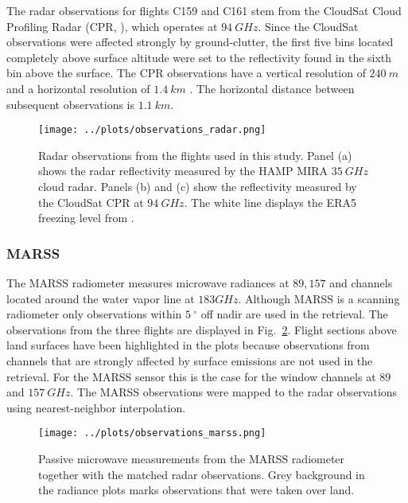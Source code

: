 \documentclass[journal abbreviation, manuscript]{copernicus}
\begin{document}
The radar observations for flights C159 and C161 stem from the CloudSat Cloud
Profiling Radar (CPR, \citet{tanelli08}), which operates at $94\ \unit{GHz}$.
Since the CloudSat observations were affected strongly by ground-clutter, the
first five bins located completely above surface altitude were set to the
reflectivity found in the sixth bin above the surface. The CPR observations
have a vertical resolution of $240\ \unit{m}$ and a horizontal resolution of
$1.4\ \unit{km}$ . The horizontal distance between subsequent observations is
$1.1\ \unit{km}$.


\begin{figure}[h!]
  \centering
  \texttt{[image: ../plots/observations\_radar.png]}
  \caption{Radar observations from the flights used in this study. Panel (a)
    shows the radar reflectivity measured by the HAMP MIRA $35\ \unit{GHz}$
    cloud radar. Panels (b) and (c) show the reflectivity measured by the
    CloudSat CPR at $94\ \unit{GHz}$. The white line displays the ERA5 freezing
    level from \citet{era5}. }
  \label{fig:observations_radar}
\end{figure}

\subsubsection{MARSS}

The MARSS radiometer measures microwave radiances at $89, 157$ and channels
located around the water vapor line at $183 \unit{GHz}$. Although MARSS is a
scanning radiometer only observations within $5\ \unit{^\circ}$ off nadir are
used in the retrieval. The observations from the three flights are displayed in
Fig.~\ref{fig:observations_marss}. Flight sections above land surfaces have been
highlighted in the plots because observations from channels that are strongly
affected by surface emissions are not used in the retrieval. For the MARSS
sensor this is the case for the window channels at $89$ and $157\ \unit{GHz}$.
The MARSS observations were mapped to the radar observations using
nearest-neighbor interpolation.

\begin{figure}[h!]
  \centering
  \texttt{[image: ../plots/observations\_marss.png]}
  \caption{
    Passive microwave measurements from the MARSS radiometer together with the
    matched radar observations. Grey background in the radiance plots marks
    observations that were taken over land.
    }
  \label{fig:observations_marss}
\end{figure}
\end{document}
